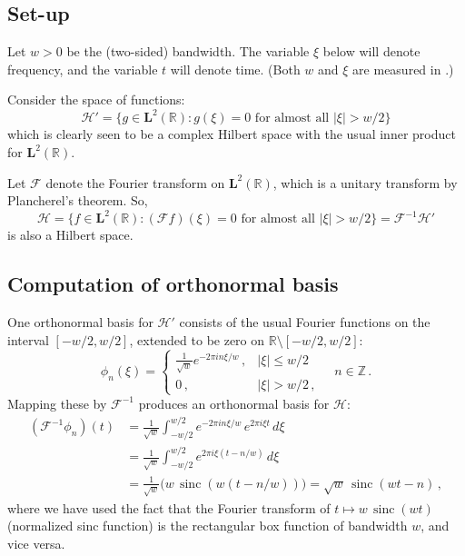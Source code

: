 \documentclass[12pt]{article}
\newcommand{\real}{\mathbb{R}}
\newcommand{\intset}{\mathbb{Z}}
\newcommand{\Hilb}{\mathcal{H}}
\newcommand{\FT}{\mathcal{F}}
\newcommand{\Le}{\mathbf{L}}
\providecommand{\abs}[1]{\lvert#1\rvert}
\DeclareMathOperator{\sinc}{sinc}
\begin{document}

\subsection{Set-up}

Let $w > 0$ be the (two-sided) bandwidth.  The variable $\xi$ below will denote
frequency, and the variable $t$ will denote time.
(Both $w$ and $\xi$ are measured in .)

Consider the space of functions:
\[
\Hilb' = \{ g \in \Le^2(\real) \colon g(\xi) = 0 \text{ for almost all } \abs{\xi} > w/2 \}
\]
which is clearly seen to be a complex Hilbert space with the usual inner product for $\Le^2(\real)$.

Let $\FT$ denote the Fourier transform on $\Le^2(\real)$,
which is a unitary transform by Plancherel's theorem.
So,
\[
\Hilb = \{ f \in \Le^2(\real) \colon 
(\FT f)(\xi) = 0 \text{ for almost all } \abs{\xi} > w/2 \} 
= \FT^{-1} \Hilb'
\]
is also a Hilbert space.

\subsection{Computation of orthonormal basis}

One orthonormal basis for $\Hilb'$ consists of the usual Fourier  functions
on the interval $[-w/2, w/2]$, extended to be zero on $\real \setminus [-w/2, w/2]$:
\[
\phi_n(\xi) = \begin{cases}
\frac{1}{\sqrt{w}} e^{-2 \pi i n \xi/w}\,, & \abs{\xi} \leq w/2 \\
0\,, & \abs{\xi} > w/2\,,
\end{cases}
\quad
n \in \intset\,.
\]
Mapping these by $\FT^{-1}$ produces an orthonormal basis for $\Hilb$:
\begin{align*}
(\FT^{-1} \phi_n)(t) &= \frac{1}{\sqrt{w}} \int_{-w/2}^{w/2} e^{-2 \pi i n \xi/w}
\, e^{2\pi i \xi t} \, d\xi \\
&= \frac{1}{\sqrt{w}} \int_{-w/2}^{w/2} e^{2 \pi i \xi (t-n/w)} \, d\xi \\
&= \frac{1}{\sqrt{w}} \bigl( w \, \sinc(w (t-n/w)) \bigr) = \sqrt{w} \, \sinc(wt-n)\,,
\end{align*}
where we have used the fact that the Fourier transform of $t \mapsto w \, \sinc(wt)$ (normalized sinc function)
is the rectangular box function of bandwidth $w$, and vice versa.
\end{document}
